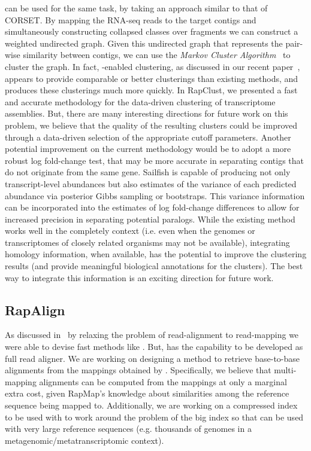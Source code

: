 \rapmap can be used for the same task, by taking an approach similar to that of CORSET. By mapping the RNA-seq reads to the target contigs and simultaneously constructing collapsed classes over fragments we can construct a weighted undirected graph. Given this undirected graph that represents the pair-wise similarity between contigs, we can use the \textit{Markov Cluster Algorithm}~\citep{van2001graph} to cluster the graph. In fact, \rapmap-enabled clustering, as discussed in our recent paper~\citep{srivastava2016accurate}, appears to provide comparable or better clusterings than existing methods, and produces these clusterings much more quickly. In RapClust, we presented a fast and accurate methodology for the data-driven clustering of \denovo transcriptome assemblies. But, there are many interesting directions for future work on this problem, we believe that the quality of the resulting clusters could be improved through a data-driven selection of the appropriate cutoff parameters. Another potential improvement on the current methodology would be to adopt a more robust log fold-change test, that may be more accurate in separating contigs that do not originate from the same gene. Sailfish is capable of producing not only transcript-level abundances but also estimates of the variance of each predicted abundance via posterior Gibbs sampling or bootstraps. This variance information can be incorporated into the estimates of log fold-change differences to allow for increased precision in separating potential paralogs. While the existing method works well in the completely \denovo context (i.e. even when the genomes or transcriptomes of closely related organisms may not be available), integrating homology information, when available, has the potential to improve the clustering results (and provide meaningful biological annotations for the clusters). The best way to integrate this information is an exciting direction for future work.  

\subsection{RapAlign}
As discussed in~ by relaxing the problem of read-alignment to read-mapping we were able to devise fast methods like \qm. But, \rapmap has the capability to be developed as full read aligner. We are working on designing a method to retrieve base-to-base alignments from the mappings obtained by \rapmap. Specifically, we believe that multi-mapping alignments can be computed from the mappings at only a marginal extra cost, given RapMap's knowledge about similarities among the reference sequence being mapped to. Additionally, we are working on a compressed index to be used with \rapmap to work around the problem of the big index so that \rapmap can be used with very large reference sequences (e.g. thousands of genomes in a metagenomic/metatranscriptomic context).